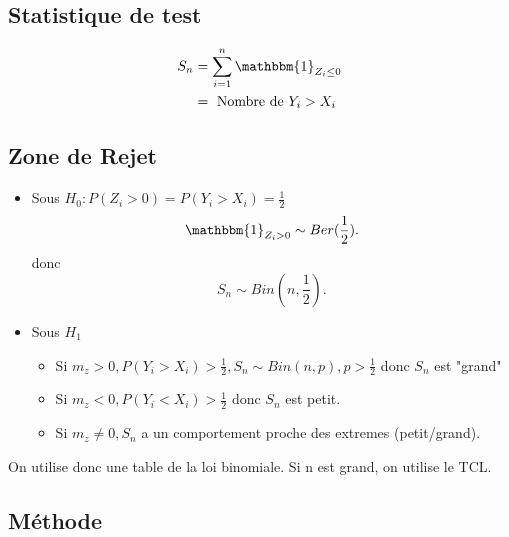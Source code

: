 \documentclass{article}
\theoremstyle{plain}%
\theoremstyle{definition}
\theoremstyle{remark}
\begin{document}
\subsection*{Statistique de test}
\begin{align*}
    S_n &= \sum_{i=1}^{n}\mathbbm{1}_{Z_i \leq 0} \\
    &= \text{ Nombre de } Y_i > X_i
\end{align*}

\subsection*{Zone de Rejet}
\begin{itemize}
    \item Sous $ H_0 : P(Z_i > 0) = P(Y_i > X_i) = \frac{1}{2} $ 
    \[
        \mathbbm{1}_{Z_i > 0} \sim Ber(\frac{1}{2})
    .\]
    donc 
    \[
        S_n \sim Bin(n,\frac{1}{2})
    .\]

    \item Sous $ H_1 $ \begin{itemize}
        \item Si $ m_z > 0, P(Y_i > X_i) > \frac{1}{2}, S_n \sim Bin(n,p), p> \frac{1}{2} $ donc $ S_n $ est "grand"
        \item Si $ m_z < 0, P(Y_i < X_i) > \frac{1}{2} $ donc $ S_n $ est petit.
        \item Si $ m_z \neq  0, S_n $ a un comportement proche des extremes (petit/grand).
    \end{itemize}
\end{itemize}

On utilise donc une table de la loi binomiale. Si n est grand, on utilise le TCL.
\subsection*{Méthode}
\end{document}

